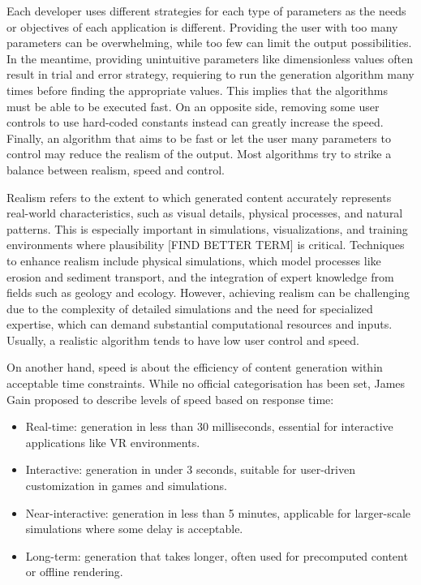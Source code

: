 Each developer uses different strategies for each type of parameters as the needs or objectives of each application is different. Providing the user with too many parameters can be overwhelming, while too few can limit the output possibilities. In the meantime, providing unintuitive parameters like dimensionless values often result in trial and error strategy, requiering to run the generation algorithm many times before finding the appropriate values. This implies that the algorithms must be able to be executed fast. On an opposite side, removing some user controls to use hard-coded constants instead can greatly increase the speed. Finally, an algorithm that aims to be fast or let the user many parameters to control may reduce the realism of the output. Most algorithms try to strike a balance between realism, speed and control.


Realism refers to the extent to which generated content accurately represents real-world characteristics, such as visual details, physical processes, and natural patterns. This is especially important in simulations, visualizations, and training environments where plausibility [FIND BETTER TERM] is critical. Techniques to enhance realism include physical simulations, which model processes like erosion and sediment transport, and the integration of expert knowledge from fields such as geology and ecology. However, achieving realism can be challenging due to the complexity of detailed simulations and the need for specialized expertise, which can demand substantial computational resources and inputs. Usually, a realistic algorithm tends to have low user control and speed.

On another hand, speed is about the efficiency of content generation within acceptable time constraints. While no official categorisation has been set, James Gain proposed to describe levels of speed based on response time:
\begin{itemize}
    \item Real-time: generation in less than 30 milliseconds, essential for interactive applications like VR environments. 
    \item Interactive: generation in under 3 seconds, suitable for user-driven customization in games and simulations. 
    \item Near-interactive: generation in less than 5 minutes, applicable for larger-scale simulations where some delay is acceptable. 
    \item Long-term: generation that takes longer, often used for precomputed content or offline rendering.
\end{itemize}

